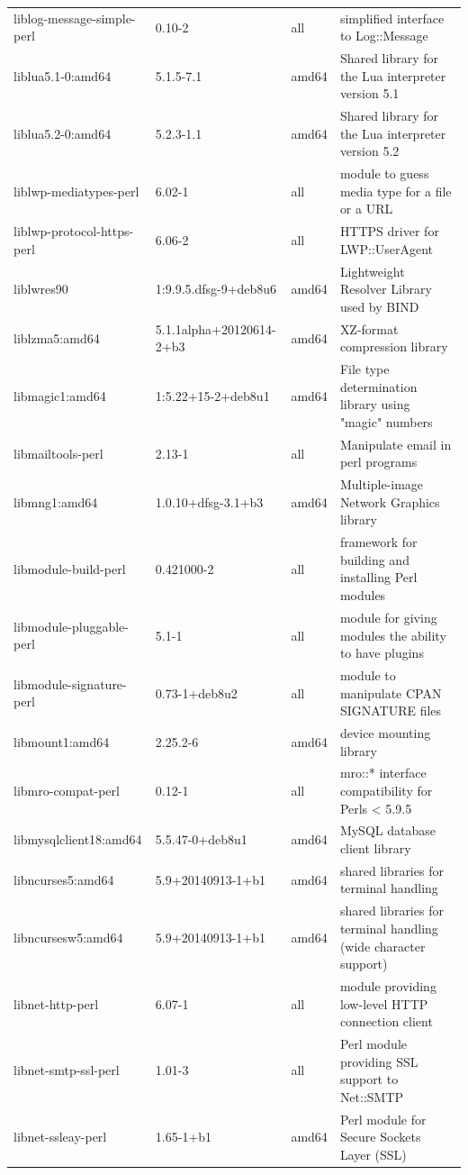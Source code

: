 \documentclass[a4paper,10pt]{article}
\begin{document}
\begin{appendices}
{\begin{longtable}{p{3.25cm}@{\hspace{0.25cm}}p{4cm}@{\hspace{0.25cm}}l@{\hspace{0.25cm}}p{7cm}}
liblog-message-simple-perl	&	0.10-2	&	all	&	simplified interface to Log::Message	\\
liblua5.1-0:amd64	&	5.1.5-7.1	&	amd64	&	Shared library for the Lua interpreter version 5.1	\\
liblua5.2-0:amd64	&	5.2.3-1.1	&	amd64	&	Shared library for the Lua interpreter version 5.2	\\
liblwp-mediatypes-perl	&	6.02-1	&	all	&	module to guess media type for a file or a URL	\\
liblwp-protocol-https-perl	&	6.06-2	&	all	&	HTTPS driver for LWP::UserAgent	\\
liblwres90	&	1:9.9.5.dfsg-9+deb8u6	&	amd64	&	Lightweight Resolver Library used by BIND	\\
liblzma5:amd64	&	5.1.1alpha+20120614-2+b3	&	amd64	&	XZ-format compression library	\\
libmagic1:amd64	&	1:5.22+15-2+deb8u1	&	amd64	&	File type determination library using "magic" numbers	\\
libmailtools-perl	&	2.13-1	&	all	&	Manipulate email in perl programs	\\
libmng1:amd64	&	1.0.10+dfsg-3.1+b3	&	amd64	&	Multiple-image Network Graphics library	\\
libmodule-build-perl	&	0.421000-2	&	all	&	framework for building and installing Perl modules	\\
libmodule-pluggable-perl	&	5.1-1	&	all	&	module for giving  modules the ability to have plugins	\\
libmodule-signature-perl	&	0.73-1+deb8u2	&	all	&	module to manipulate CPAN SIGNATURE files	\\
libmount1:amd64	&	2.25.2-6	&	amd64	&	device mounting library	\\
libmro-compat-perl	&	0.12-1	&	all	&	mro::* interface compatibility for Perls < 5.9.5	\\
libmysqlclient18:amd64	&	5.5.47-0+deb8u1	&	amd64	&	MySQL database client library	\\
libncurses5:amd64	&	5.9+20140913-1+b1	&	amd64	&	shared libraries for terminal handling	\\
libncursesw5:amd64	&	5.9+20140913-1+b1	&	amd64	&	shared libraries for terminal handling (wide character support)	\\
libnet-http-perl	&	6.07-1	&	all	&	module providing low-level HTTP connection client	\\
libnet-smtp-ssl-perl	&	1.01-3	&	all	&	Perl module providing SSL support to Net::SMTP	\\
libnet-ssleay-perl	&	1.65-1+b1	&	amd64	&	Perl module for Secure Sockets Layer (SSL)	\\

\end{longtable}}
\end{appendices}
\end{document}
